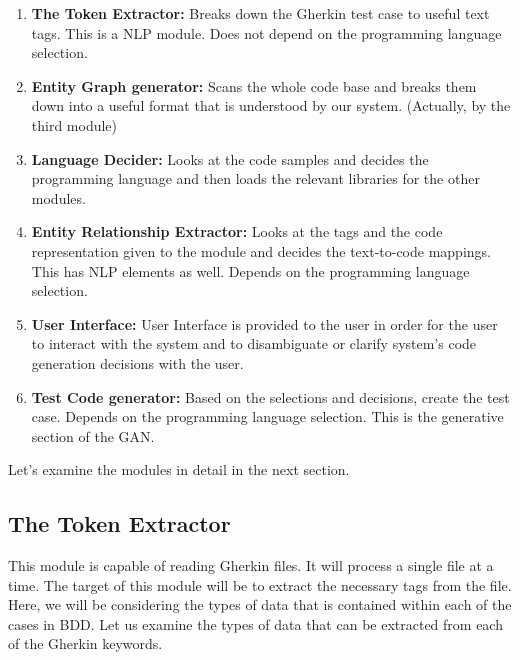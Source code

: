 \documentclass[conference, onecolumn, a4, 12pt]{IEEEtran}
\begin{document}
\begin{enumerate}
	\item \textbf{The Token Extractor:}
	Breaks down the Gherkin test case to useful text tags. This is a NLP module. Does not depend on the programming language selection.
	\item \textbf{Entity Graph generator:}
	Scans the whole code base and breaks them down into a useful format that is understood by our system. (Actually, by the third module)
	\item \textbf{Language Decider:}
	Looks at the code samples and decides the programming language and then loads the relevant libraries for the other modules.
	\item \textbf{Entity Relationship Extractor:}
	Looks at the tags and the code representation given to the module and decides the text-to-code mappings. This has NLP elements as well. Depends on the programming language selection.
	\item \textbf{User Interface:}
	User Interface is provided to the user in order for the user to interact with the system and to disambiguate or clarify system's code generation decisions with the user.
	\item \textbf{Test Code generator:}
	Based on the selections and decisions, create the test case. Depends on the programming language selection. This is the generative section of the GAN.
	
\end{enumerate}

Let's examine the modules in detail in the next section.

\subsection{The Token Extractor}
This module is capable of reading Gherkin files. It will process a single file at a time. The target of this module will be to extract the necessary tags from the file. Here, we will be considering the types of data that is contained within each of the cases in BDD. Let us examine the types of data that can be extracted from each of the Gherkin keywords.
\end{document}
